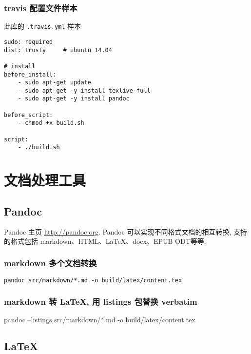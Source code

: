 \subsubsection{travis
配置文件样本}\label{travis-ux914dux7f6eux6587ux4ef6ux6837ux672c}

此库的 \lstinline!.travis.yml! 样本

\begin{lstlisting}
sudo: required
dist: trusty     # ubuntu 14.04

# install
before_install:
    - sudo apt-get update
    - sudo apt-get -y install texlive-full
    - sudo apt-get -y install pandoc

before_script:
    - chmod +x build.sh

script:
    - ./build.sh
\end{lstlisting}

\section{文档处理工具}\label{ux6587ux6863ux5904ux7406ux5de5ux5177}

\subsection{Pandoc}\label{pandoc}

Pandoc 主页 \url{http://pandoc.org}. Pandoc
可以实现不同格式文档的相互转换, 支持的格式包括
markdown、HTML、LaTeX、docx、EPUB ODT等等.

\subsubsection{markdown
多个文档转换}\label{markdown-ux591aux4e2aux6587ux6863ux8f6cux6362}

\begin{lstlisting}
pandoc src/markdown/*.md -o build/latex/content.tex
\end{lstlisting}

\subsubsection{markdown 转 LaTeX, 用 listings 包替换
verbatim}\label{markdown-ux8f6c-latex-ux7528-listings-ux5305ux66ffux6362-verbatim}

pandoc --listings src/markdown/*.md -o build/latex/content.tex

\subsection{LaTeX}\label{latex}

